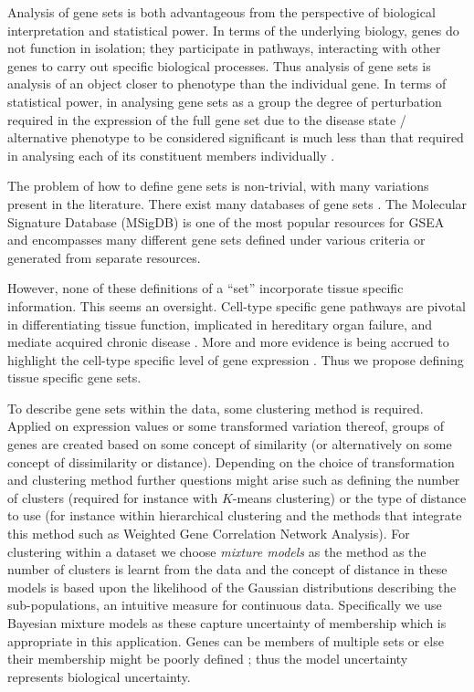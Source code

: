 \documentclass[12pt]{article} %
\begin{document}
	Analysis of gene sets is both advantageous from the perspective of biological interpretation and statistical power. In terms of the underlying biology, genes do not function in isolation; they participate in pathways, interacting with other genes to carry out specific biological processes. Thus analysis of gene sets is analysis of an object closer to phenotype than the individual gene. In terms of statistical power, in analysing gene sets as a group the degree of perturbation required in the expression of the full gene set due to the disease state / alternative phenotype to be considered significant is much less than that required in analysing each of its constituent members individually \cite{DudbridgePowerPredictiveAccuracy2013}\cite{WrayResearchReviewPolygenic2014}.
	
	The problem of how to define gene sets is non-trivial, with many variations present in the literature. There exist many databases of gene sets \cite{AshburnerGeneOntologytool2000a}\cite{KanehisaNewapproachunderstanding2019}\cite{SzklarczykSTRINGv11protein2019}. The Molecular Signature Database \cite{SubramanianGenesetenrichment2005a} (MSigDB) is one of the most popular resources for GSEA and encompasses many different gene sets defined under various criteria or generated from separate resources.
	
	However, none of these definitions of a ``set'' incorporate tissue specific information. This seems an oversight. Cell-type specific gene pathways are pivotal in differentiating tissue function, implicated in hereditary organ failure, and mediate acquired chronic disease \cite{JuDefiningcelltypespecificity2013a}. More and more evidence is being accrued to highlight the cell-type specific level of gene expression \cite{GrundbergMappingcistransregulatory2012}\cite{OngEnhancerfunctionnew2011}\cite{ManiatisRegulationinducibletissuespecific1987}. Thus we propose defining tissue specific gene sets. 
	
	To describe gene sets within the data, some clustering method is required. Applied on expression values or some transformed variation thereof, groups of genes are created based on some concept of similarity (or alternatively on some concept of dissimilarity or distance). Depending on the choice of transformation and clustering method further questions might arise such as defining the number of clusters (required for instance with $K$-means clustering) or the type of distance to use (for instance within hierarchical clustering and the methods that integrate this method such as Weighted Gene Correlation Network Analysis). For clustering within a dataset we choose \emph{mixture models} as the method as the number of clusters is learnt from the data and the concept of distance in these models is based upon the likelihood of the Gaussian distributions describing the sub-populations, an intuitive measure for continuous data. Specifically we use Bayesian mixture models as these capture uncertainty of membership which is appropriate in this application. Genes can be members of multiple sets or else their membership might be poorly defined \cite{Pita-JuarezPathwayCoexpressionNetwork2018}; thus the model uncertainty represents biological uncertainty.
\end{document}
